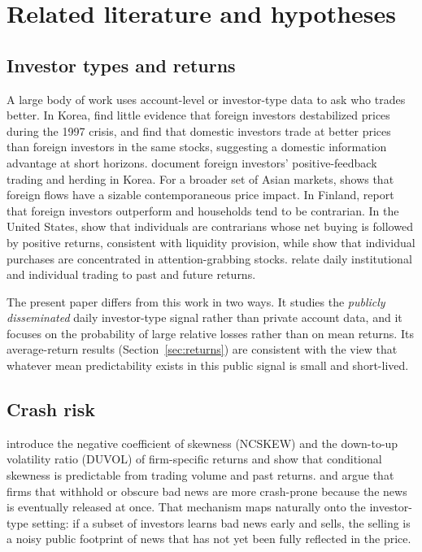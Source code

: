 \documentclass[11pt]{article}
\begin{document}
\section{Related literature and hypotheses}\label{sec:lit}

\subsection{Investor types and returns}
A large body of work uses account-level or investor-type data to ask who trades better. In Korea, \citet{choe1999}
find little evidence that foreign investors destabilized prices during the 1997 crisis, and \citet{choe2005} find that
domestic investors trade at better prices than foreign investors in the same stocks, suggesting a domestic information
advantage at short horizons. \citet{kim2002} document foreign investors' positive-feedback trading and herding in Korea.
For a broader set of Asian markets, \citet{richards2005} shows that foreign flows have a sizable contemporaneous price
impact. In Finland, \citet{grinblatt2000} report that foreign investors outperform and households tend to be
contrarian. In the United States, \citet{kaniel2008} show that individuals are contrarians whose net buying is followed
by positive returns, consistent with liquidity provision, while \citet{barber2008} show that individual purchases are
concentrated in attention-grabbing stocks. \citet{griffin2003} relate daily institutional and individual trading to
past and future returns.

The present paper differs from this work in two ways. It studies the \emph{publicly disseminated} daily investor-type
signal rather than private account data, and it focuses on the probability of large relative losses rather than on
mean returns. Its average-return results (Section~\ref{sec:returns}) are consistent with the view that whatever mean
predictability exists in this public signal is small and short-lived.

\subsection{Crash risk}
\citet{chen2001} introduce the negative coefficient of skewness (NCSKEW) and the down-to-up volatility ratio (DUVOL)
of firm-specific returns and show that conditional skewness is predictable from trading volume and past returns.
\citet{jin2006} and \citet{hutton2009} argue that firms that withhold or obscure bad news are more crash-prone because
the news is eventually released at once. That mechanism maps naturally onto the investor-type setting: if a subset of
investors learns bad news early and sells, the selling is a noisy public footprint of news that has not yet been fully
reflected in the price.
\end{document}
